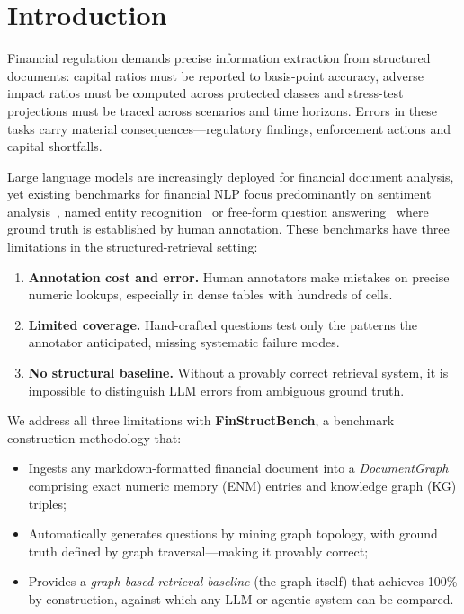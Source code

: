 \documentclass[11pt]{article}
\begin{document}
\section{Introduction}
\label{sec:intro}

Financial regulation demands precise information extraction from structured
documents: capital ratios must be reported to basis-point accuracy, adverse
impact ratios must be computed across protected classes and stress-test
projections must be traced across scenarios and time horizons.  Errors in
these tasks carry material consequences---regulatory findings, enforcement
actions and capital shortfalls.

Large language models are increasingly deployed for financial document
analysis, yet existing benchmarks for financial NLP focus predominantly on
sentiment analysis~\citep{malo2014good}, named entity recognition~\citep{alvarado2015domain}
or free-form question answering~\citep{chen2021finqa, zhu2021tat} where ground
truth is established by human annotation.  These benchmarks have three
limitations in the structured-retrieval setting:

\begin{enumerate}[leftmargin=2em]
  \item \textbf{Annotation cost and error.}  Human annotators make mistakes on
    precise numeric lookups, especially in dense tables with hundreds of cells.
  \item \textbf{Limited coverage.}  Hand-crafted questions test only the
    patterns the annotator anticipated, missing systematic failure modes.
  \item \textbf{No structural baseline.}  Without a provably correct retrieval
    system, it is impossible to distinguish LLM errors from ambiguous ground truth.
\end{enumerate}

We address all three limitations with \textbf{FinStructBench}, a benchmark
construction methodology that:
\begin{itemize}[leftmargin=2em]
  \item Ingests any markdown-formatted financial document into a
    \emph{DocumentGraph} comprising exact numeric memory (ENM) entries and
    knowledge graph (KG) triples;
  \item Automatically generates questions by mining graph topology, with
    ground truth defined by graph traversal---making it provably correct;
  \item Provides a \emph{graph-based retrieval baseline} (the graph itself)
    that achieves 100\% by construction, against which any LLM or agentic
    system can be compared.
\end{itemize}
\end{document}
